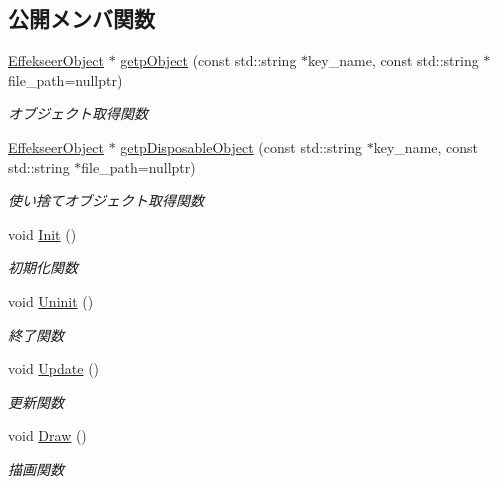 \subsection*{公開メンバ関数}
\begin{DoxyCompactItemize}
\item 
\mbox{\hyperlink{class_effekseer_object}{Effekseer\+Object}} $\ast$ \mbox{\hyperlink{class_effekseer_manager_ad5115f7429fe74a5ba1cccb227f232ea}{getp\+Object}} (const std\+::string $\ast$key\+\_\+name, const std\+::string $\ast$file\+\_\+path=nullptr)
\begin{DoxyCompactList}\small\item\em オブジェクト取得関数 \end{DoxyCompactList}\item 
\mbox{\hyperlink{class_effekseer_object}{Effekseer\+Object}} $\ast$ \mbox{\hyperlink{class_effekseer_manager_a910e7944de2493bd133829951ac4718a}{getp\+Disposable\+Object}} (const std\+::string $\ast$key\+\_\+name, const std\+::string $\ast$file\+\_\+path=nullptr)
\begin{DoxyCompactList}\small\item\em 使い捨てオブジェクト取得関数 \end{DoxyCompactList}\item 
void \mbox{\hyperlink{class_effekseer_manager_aa59ee9fe8ea2968ff094366f9a648499}{Init}} ()
\begin{DoxyCompactList}\small\item\em 初期化関数 \end{DoxyCompactList}\item 
void \mbox{\hyperlink{class_effekseer_manager_a020848a5d9523d3462bc1f6ea715ea75}{Uninit}} ()
\begin{DoxyCompactList}\small\item\em 終了関数 \end{DoxyCompactList}\item 
void \mbox{\hyperlink{class_effekseer_manager_a2278033d786e1ada0fcaa390a613a8f9}{Update}} ()
\begin{DoxyCompactList}\small\item\em 更新関数 \end{DoxyCompactList}\item 
void \mbox{\hyperlink{class_effekseer_manager_a0c9155e72b0552e5138e68be682a63a4}{Draw}} ()
\begin{DoxyCompactList}\small\item\em 描画関数 \end{DoxyCompactList}\item 

\end{DoxyCompactItemize}
